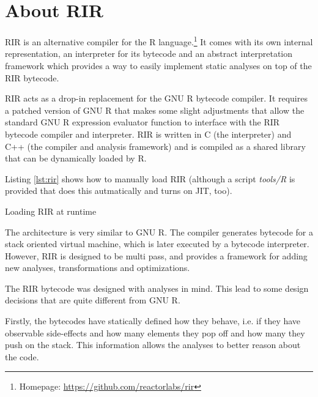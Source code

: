 \chapter{About RIR\label{rir}}

RIR is an alternative compiler for the R language.\footnote{Homepage: \url{https://github.com/reactorlabs/rir}} It comes with its own internal representation, an interpreter for its bytecode and an abstract interpretation framework which provides a way to easily implement static analyses on top of the RIR bytecode.

RIR acts as a drop-in replacement for the GNU R bytecode compiler. It requires a patched version of GNU R that makes some slight adjustments that allow the standard GNU R expression evaluator function to interface with the RIR bytecode compiler and interpreter. RIR is written in C (the interpreter) and C++ (the compiler and analysis framework) and is compiled as a shared library that can be dynamically loaded by R.

Listing \ref{lst:rir} shows how to manually load RIR (although a script \emph{tools/R} is provided that does this autmatically and turns on JIT, too).

\begin{listing}[htbp]
  \caption{\label{lst:rir}Loading RIR at runtime}
  \begin{rcode}
> dyn.load("~/rir/build/librir.so")  # path to the shared object
> source("~/rir/rir/R/rir.R")  # load the API for RIR compiler
> # RIR is now ready:
> f <- rir.compile(function() {})
> f
function() {}
<bytecode: 0x34b4510>
> rir.disassemble(f)
0x2f80538
   guard_fun_  { == 0x2077cd8
   push_  23 # NULL
   ret_ 
  \end{rcode}
\end{listing}

The architecture is very similar to GNU R. The compiler generates bytecode for a stack oriented virtual machine, which is later executed by a bytecode interpreter. However, RIR is designed to be multi pass, and provides a framework for adding new analyses, transformations and optimizations.

The RIR bytecode was designed with analyses in mind. This lead to some design decisions that are quite different from GNU R.

Firstly, the bytecodes have statically defined how they behave, i.e. if they have observable side-effects and how many elements they pop off and how many they push on the stack. This information allows the analyses to better reason about the code.

